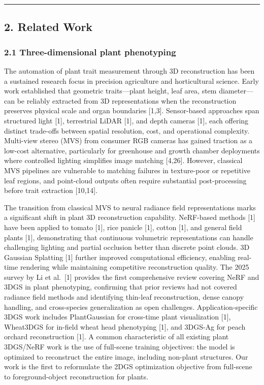 \documentclass[11pt,a4paper]{article}
\begin{document}
\begin{center}\rule{0.5\linewidth}{0.5pt}\end{center}

\subsection{2. Related Work}\label{related-work}

\subsubsection{2.1 Three-dimensional plant
phenotyping}\label{three-dimensional-plant-phenotyping}

The automation of plant trait measurement through 3D reconstruction has
been a sustained research focus in precision agriculture and
horticultural science. Early work established that geometric
traits---plant height, leaf area, stem diameter---can be reliably
extracted from 3D representations when the reconstruction preserves
physical scale and organ boundaries {[}1,3{]}. Sensor-based approaches
span structured light {[}1{]}, terrestrial LiDAR {[}1{]}, and depth
cameras {[}1{]}, each offering distinct trade-offs between spatial
resolution, cost, and operational complexity. Multi-view stereo (MVS)
from consumer RGB cameras has gained traction as a low-cost alternative,
particularly for greenhouse and growth chamber deployments where
controlled lighting simplifies image matching {[}4,26{]}. However,
classical MVS pipelines are vulnerable to matching failures in
texture-poor or repetitive leaf regions, and point-cloud outputs often
require substantial post-processing before trait extraction {[}10,14{]}.

The transition from classical MVS to neural radiance field
representations marks a significant shift in plant 3D reconstruction
capability. NeRF-based methods {[}1{]} have been applied to tomato
{[}1{]}, rice panicle {[}1{]}, cotton {[}1{]}, and general field plants
{[}1{]}, demonstrating that continuous volumetric representations can
handle challenging lighting and partial occlusion better than discrete
point clouds. 3D Gaussian Splatting {[}1{]} further improved
computational efficiency, enabling real-time rendering while maintaining
competitive reconstruction quality. The 2025 survey by Li et al.~{[}1{]}
provides the first comprehensive review covering NeRF and 3DGS in plant
phenotyping, confirming that prior reviews had not covered radiance
field methods and identifying thin-leaf reconstruction, dense canopy
handling, and cross-species generalization as open challenges.
Application-specific 3DGS work includes PlantGaussian for cross-time
plant visualization {[}1{]}, Wheat3DGS for in-field wheat head
phenotyping {[}1{]}, and 3DGS-Ag for peach orchard reconstruction
{[}1{]}. A common characteristic of all existing plant 3DGS/NeRF work is
the use of full-scene training objectives: the model is optimized to
reconstruct the entire image, including non-plant structures. Our work
is the first to reformulate the 2DGS optimization objective from
full-scene to foreground-object reconstruction for plants.
\end{document}
